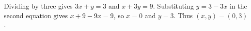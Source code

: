 Dividing by three gives $3x+y=3$ and $x+3y=9$. Substituting $y=3-3x$ in the second equation gives $x+9-9x=9$, so $x=0$ and $y=3$. Thus $\boxed{(x,y)=(0,3)}$.
